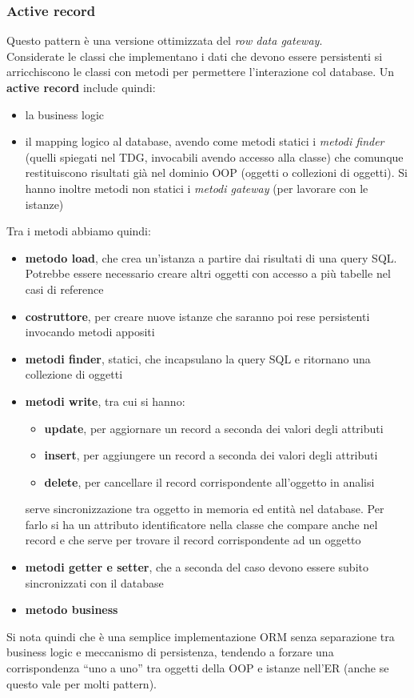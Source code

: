 \subsubsection{Active record}
Questo pattern è una versione ottimizzata del \textit{row data gateway}.\\ Considerate le classi che implementano i dati che devono essere persistenti si arricchiscono le classi con metodi per permettere l'interazione col database. Un \textbf{active record} include quindi:
\begin{itemize}
    \item la business logic
    \item il mapping logico al database, avendo come metodi statici i \textit{metodi finder} (quelli spiegati nel TDG, invocabili avendo accesso alla classe) che comunque restituiscono risultati già nel dominio OOP (oggetti o collezioni di oggetti). Si hanno inoltre metodi non statici i \textit{metodi gateway} (per lavorare con le istanze)
\end{itemize}
Tra i metodi abbiamo quindi:
\begin{itemize}
    \item \textbf{metodo load}, che crea un'istanza a partire dai risultati di una query SQL. Potrebbe essere necessario creare altri oggetti con accesso a più
    tabelle nel casi di reference
    \item \textbf{costruttore}, per creare nuove istanze che saranno poi rese persistenti invocando metodi appositi
    \item \textbf{metodi finder}, statici, che incapsulano la query SQL e ritornano una collezione di oggetti
    \item \textbf{metodi write}, tra cui si hanno:
    \begin{itemize}
        \item \textbf{update}, per aggiornare un record a seconda dei valori degli attributi 
        \item \textbf{insert}, per aggiungere un record a seconda dei valori degli attributi 
        \item \textbf{delete}, per cancellare il record corrispondente all'oggetto in analisi
    \end{itemize}
    serve sincronizzazione tra oggetto in memoria ed entità nel database. Per farlo si ha un attributo identificatore nella classe che compare anche nel record e che serve per trovare il record corrispondente ad un oggetto
    \item \textbf{metodi getter e setter}, che a seconda del caso devono essere subito sincronizzati con il database
    \item \textbf{metodo business}
\end{itemize}
Si nota quindi che è una semplice implementazione ORM senza separazione tra business logic e meccanismo di persistenza, tendendo a forzare una corrispondenza ``uno a uno'' tra oggetti della OOP e istanze nell'ER (anche se questo vale per molti pattern).
